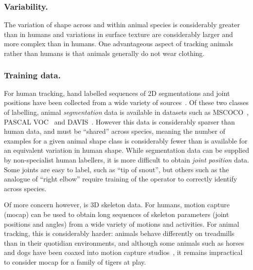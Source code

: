 \subsubsection*{Variability.}
The variation of shape across and within animal species is considerably greater than in humans and variations in surface texture are considerably larger and more complex than in humans. One advantageous aspect of tracking animals rather than humans is that animals generally do not wear clothing. 


\subsubsection*{Training data.}
For human tracking, hand labelled sequences of 2D segmentations and joint positions have been collected from a wide variety of sources~\cite{andriluka14cvpr,lin2014microsoft,johnson2010clustered}. Of these two classes of labelling, animal {\em segmentation} data is available in datasets such as MSCOCO~\cite{lin2014microsoft}, PASCAL VOC~\cite{everingham2010pascal} and DAVIS~\cite{Perazzi2016}.  However this data is considerably sparser than human data, and must be ``shared'' across species, meaning the number of examples for a given animal shape class is considerably fewer than is available for an equivalent variation in human shape.  While segmentation data can be supplied by non-specialist human labellers, it is more difficult to obtain {\em joint position} data.  Some joints are easy to label, such as ``tip of snout'', but others such as the analogue of ``right elbow'' require training of the operator to correctly identify across species.

Of more concern however, is 3D skeleton data.  For humans, motion capture (mocap) can be used to obtain long sequences of skeleton parameters (joint positions and angles) from a wide variety of motions and activities.
For animal tracking, this is considerably harder: animals behave differently on treadmills than in their quotidian environments, and although some animals such as horses and dogs have been coaxed into motion capture studios~\cite{wilhelm2015furyexplorer}, it remains impractical to consider mocap for a family of tigers at play.

